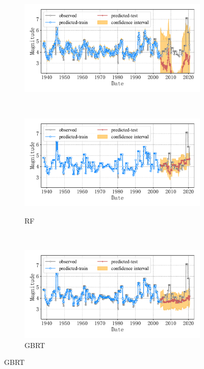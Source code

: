 \begin{figure}[!htbp]
\begin{subfigure}[b]{0.45\textwidth}
      \includegraphics[width=\textwidth]{Img/chap5_seism/block1/seism_lr_minyear_1932_maxyear_2021_spanlat_2_spanlon_4_timewindow_72_nextmonth_12_minmag_3.0_block_1.pdf}
      \vspace{-1cm}
      \label{fig:seism_lr_minyear_1932_maxyear_2021_spanlat_2_spanlon_4_timewindow_72_nextmonth_12_minmag_3.0_block_1}
  \end{subfigure}
  ~
  \begin{subfigure}[b]{0.45\textwidth}
    \caption{RF}
    \vspace{-0.2cm}
    \includegraphics[width=\textwidth]{Img/chap5_seism/block1/seism_rf_minyear_1932_maxyear_2021_spanlat_2_spanlon_4_timewindow_72_nextmonth_12_minmag_3.0_block_1.pdf}
    \vspace{-1cm}
    \label{fig:seism_rf_minyear_1932_maxyear_2021_spanlat_2_spanlon_4_timewindow_72_nextmonth_12_minmag_3.0_block_1}
  \end{subfigure}
  \\
  \begin{subfigure}[b]{0.45\textwidth}
    \caption{GBRT}
    \vspace{-0.2cm}
    \includegraphics[width=\textwidth]{Img/chap5_seism/block1/seism_gbr_minyear_1932_maxyear_2021_spanlat_2_spanlon_4_timewindow_72_nextmonth_12_minmag_3.0_block_1.pdf}

\end{subfigure}
\end{figure}
